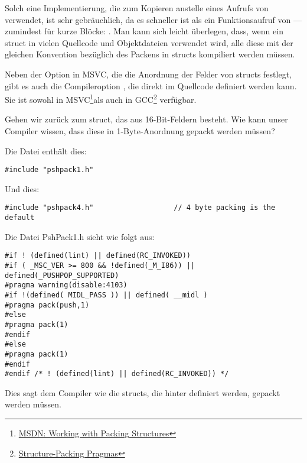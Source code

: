 Solch eine Implementierung, die zum Kopieren \MOV anstelle eines Aufrufs von  verwendet, ist sehr
gebräuchlich, da es schneller ist als ein Funktionsaufruf von ---zumindest für kurze Blöcke:
.
Man kann sich leicht überlegen, dass, wenn ein struct in vielen Quellcode und Objektdateien verwendet wird, alle diese
mit der gleichen Konvention bezüglich des Packens in structs kompiliert werden müssen.

\newcommand{\FNURLMSDNZP}{\footnote{\href{http://go.yurichev.com/17067}
{MSDN: Working with Packing Structures}}}
\newcommand{\FNURLGCCPC}{\footnote{\href{http://go.yurichev.com/17068}
{Structure-Packing Pragmas}}}
Neben der Option  in MSVC, die die Anordnung der Felder von structs festlegt, gibt es auch die
Compileroption , die direkt im Quellcode definiert werden kann.
Sie ist sowohl in MSVC\FNURLMSDNZP als auch in GCC\FNURLGCCPC{} verfügbar.

Gehen wir zurück zum  struct, das aus 16-Bit-Feldern besteht.
Wie kann unser Compiler wissen, dass diese in 1-Byte-Anordnung gepackt werden müssen?

Die Datei  enthält dies:

\begin{lstlisting}[caption=WinNT.h,style=customc]
#include "pshpack1.h"
\end{lstlisting}

Und dies:

\begin{lstlisting}[caption=WinNT.h,style=customc]
#include "pshpack4.h"                   // 4 byte packing is the default
\end{lstlisting}

Die Datei PshPack1.h sieht wie folgt aus:

\begin{lstlisting}[caption=PshPack1.h,style=customc]
#if ! (defined(lint) || defined(RC_INVOKED))
#if ( _MSC_VER >= 800 && !defined(_M_I86)) || defined(_PUSHPOP_SUPPORTED)
#pragma warning(disable:4103)
#if !(defined( MIDL_PASS )) || defined( __midl )
#pragma pack(push,1)
#else
#pragma pack(1)
#endif
#else
#pragma pack(1)
#endif
#endif /* ! (defined(lint) || defined(RC_INVOKED)) */
\end{lstlisting}
Dies sagt dem Compiler wie die structs, die hinter  definiert werden, gepackt werden müssen.


